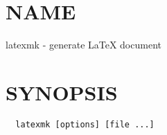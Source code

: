  
 

\section{NAME}

latexmk - generate LaTeX document

\section{SYNOPSIS}

\begin{verbatim}
  latexmk [options] [file ...]
\end{verbatim}






